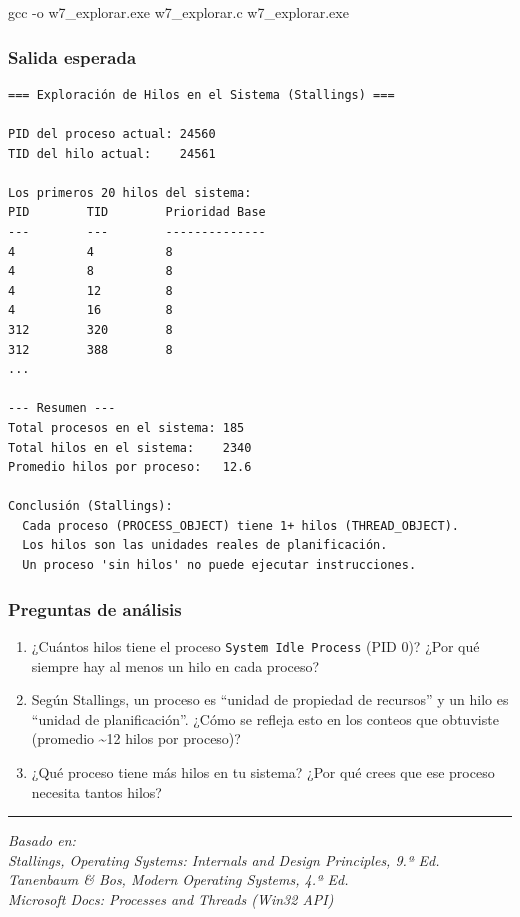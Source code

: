 \documentclass[
  spanish,
]{article}
\newenvironment{Shaded}{}{}
\newcommand{\AttributeTok}[1]{\textcolor[rgb]{0.49,0.56,0.16}{#1}}
\newcommand{\NormalTok}[1]{#1}
\providecommand{\tightlist}{%
  \setlength{\itemsep}{0pt}\setlength{\parskip}{0pt}}
\begin{document}
\begin{Shaded}
\begin{Highlighting}[]
\NormalTok{gcc }\AttributeTok{{-}o}\NormalTok{ w7\_explorar.exe w7\_explorar.c}
\NormalTok{w7\_explorar.exe}
\end{Highlighting}
\end{Shaded}

\subsubsection{Salida esperada}\label{salida-esperada-6}

\begin{verbatim}
=== Exploración de Hilos en el Sistema (Stallings) ===

PID del proceso actual: 24560
TID del hilo actual:    24561

Los primeros 20 hilos del sistema:
PID        TID        Prioridad Base
---        ---        --------------
4          4          8
4          8          8
4          12         8
4          16         8
312        320        8
312        388        8
...

--- Resumen ---
Total procesos en el sistema: 185
Total hilos en el sistema:    2340
Promedio hilos por proceso:   12.6

Conclusión (Stallings):
  Cada proceso (PROCESS_OBJECT) tiene 1+ hilos (THREAD_OBJECT).
  Los hilos son las unidades reales de planificación.
  Un proceso 'sin hilos' no puede ejecutar instrucciones.
\end{verbatim}

\subsubsection{Preguntas de análisis}\label{preguntas-de-anuxe1lisis-6}

\begin{enumerate}
\def\labelenumi{\arabic{enumi}.}
\tightlist
\item
  ¿Cuántos hilos tiene el proceso \texttt{System\ Idle\ Process} (PID
  0)? ¿Por qué siempre hay al menos un hilo en cada proceso?
\item
  Según Stallings, un proceso es ``unidad de propiedad de recursos'' y
  un hilo es ``unidad de planificación''. ¿Cómo se refleja esto en los
  conteos que obtuviste (promedio \textasciitilde12 hilos por proceso)?
\item
  ¿Qué proceso tiene más hilos en tu sistema? ¿Por qué crees que ese
  proceso necesita tantos hilos?
\end{enumerate}

\begin{center}\rule{0.5\linewidth}{0.5pt}\end{center}

\emph{Basado en:}\\
\emph{Stallings, Operating Systems: Internals and Design Principles, 9.ª
Ed.}\\
\emph{Tanenbaum \& Bos, Modern Operating Systems, 4.ª Ed.}\\
\emph{Microsoft Docs: Processes and Threads (Win32 API)}
\end{document}
